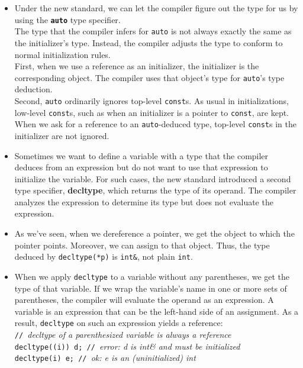 \begin{itemize}
\item
Under the new standard, we can let the compiler figure out the type for us by using the \textbf{\texttt{auto}} type specifier.\\
The type that the compiler infers for \texttt{auto} is not always exactly the same as the initializer's type. Instead, the compiler adjusts the type to conform to normal initialization rules.\\
First, when we use a reference as an initializer, the initializer is the corresponding object. The compiler uses that object's type for \texttt{auto}'s type deduction.\\
Second, \texttt{auto} ordinarily ignores top-level \texttt{const}s. As usual in initializations, low-level \texttt{const}s, such as when an initializer is a pointer to \texttt{const}, are kept.\\
When we ask for a reference to an \texttt{auto}-deduced type, top-level \texttt{const}s in the initializer are not ignored.

\item
Sometimes we want to define a variable with a type that the compiler deduces from an expression but do not want to use that expression to initialize the variable. For such cases, the new standard introduced a second type specifier, \textbf{decltype}, which returns the type of its operand. The compiler analyzes the expression to determine its type but does not evaluate the expression.

\item
As we've seen, when we dereference a pointer, we get the object to which the pointer points. Moreover, we can assign to that object. Thus, the type deduced by \texttt{decltype(*p)} is \texttt{int\&}, not plain \texttt{int}.

\item
When we apply \texttt{decltype} to a variable without any parentheses, we get the type of that variable. If we wrap the variable's name in one or more sets of parentheses, the compiler will evaluate the operand as an expression. A variable is an expression that can be the left-hand side of an assignment. As a result, \texttt{decltype} on such an expression yields a reference:\\
\hspace*{1em}\texttt{// }\textit{decltype of a parenthesized variable is always a reference}\\
\hspace*{1em}\texttt{decltype((i)) d; // }\textit{error: d is int\& and must be initialized}\\
\hspace*{1em}\texttt{decltype(i) e; // }\textit{ok: e is an (uninitialized) int}


\end{itemize}
